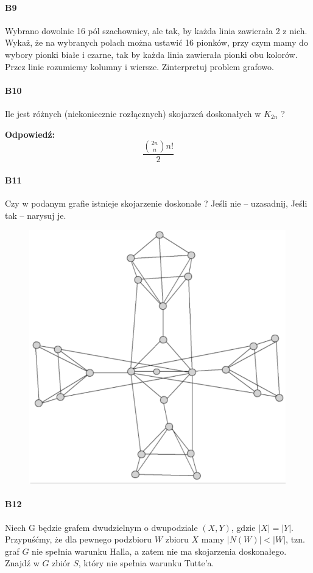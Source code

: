 \documentclass[a4paper,12pt]{article}
\theoremstyle{definition}%
\theoremstyle{definition}
\theoremstyle{problem}
\begin{document}
\paragraph{B9} Wybrano dowolnie 16 pól szachownicy, ale tak, by każda linia zawierała 2 z nich. Wykaż, że na wybranych polach można ustawić 16 pionków, przy czym mamy do wybory pionki białe i czarne, tak by każda linia zawierała pionki obu kolorów. Przez linie rozumiemy kolumny i wiersze. Zinterpretuj problem grafowo.

\paragraph{B10} Ile jest różnych (niekoniecznie rozłącznych) skojarzeń doskonałych w $K_{2n}$ ?

\textbf{Odpowiedź:}
$$\frac{\binom{2n}{n}n!}{2}$$
\paragraph{B11} Czy w podanym grafie istnieje skojarzenie doskonałe ? Jeśli nie – uzasadnij, Jeśli tak – narysuj je.
\begin{figure}[H]
\centering
\includegraphics[width=.9\textwidth]{img/2_B11}
\end{figure}

\paragraph{B12} Niech G będzie grafem dwudzielnym o dwupodziale $(X, Y )$, gdzie $|X| = |Y |$. Przypuśćmy, że dla pewnego podzbioru $W$ zbioru $X$ mamy $|N(W)| < |W|$, tzn. graf $G$ nie spełnia warunku Halla, a zatem nie ma skojarzenia doskonałego. Znajdź w $G$ zbiór $S$, który nie spełnia warunku Tutte’a.
\end{document}
